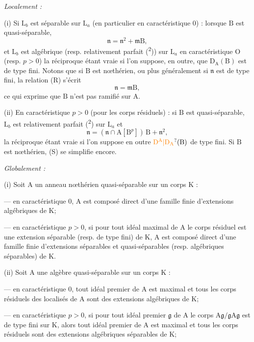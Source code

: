 \textit{Localement :}

(i) Si $\mathrm L_b$ est séparable sur $\mathrm L_a$ (en particulier en caractéristique $0$) : lorsque $\mathrm B$ est quasi-séparable,
\[
\mathfrak n=\mathfrak n^2+\mathfrak m\mathrm B,\tag*{(R)}
\]
et $\mathrm L_b$ est algébrique (resp. relativement parfait (\textsuperscript{2})) sur $\mathrm L_a$ en caractéristique $\mathrm O$ (resp. $p>0$) la réciproque étant vraie si l’on suppose, en outre, que $\mathrm D_{\mathrm A}(\mathrm B)$ est de type fini. Notons que si $\mathrm B$ est nœthérien, ou plus généralement si $\mathfrak n$ est de type fini, la relation (R) s’écrit
\[
\mathfrak n=\mathfrak m\mathrm B,
\]
ce qui exprime que $\mathrm B$ n’est pas ramifié sur $\mathrm A$.

(ii) En caractéristique $p>0$ (pour les corps résiduels) : si $\mathrm B$ est quasi-séparable, $\mathrm L_b$ est relativement parfait (\textsuperscript{2}) sur $\mathrm L_a$ et
\[
\mathfrak n=(\mathfrak n\cap\mathrm A[\mathrm B^p])\,\mathrm B+\mathfrak n^2,\tag*{(S)}
\]
la réciproque étant vraie si l’on suppose en outre $\unsure{\mathrm D^{\mathrm A}|\mathrm D_{\mathrm A}}(\mathrm B)$ de type fini. Si $\mathrm B$ est nœthérien, (S) se simplifie encore.

\textit{Globalement :}

(i) Soit $\mathrm A$ un anneau nœthérien quasi-séparable sur un corps $\mathrm K$ :

--- en caractéristique $0$, $\mathrm A$ est composé direct d’une famille finie d’extensions algébriques de $\mathrm K$;

--- en caractéristique $p>0$, si pour tout idéal maximal de $\mathrm A$ le corps résiduel est une extension séparable (resp. de type fini) de $\mathrm K$, $\mathrm A$ est composé direct d’une famille finie d’extensions séparables et quasi-séparables (resp. algébriques séparables) de $\mathrm K$.

(ii) Soit $\mathrm A$ une algèbre quasi-séparable sur un corps $\mathrm K$ :

--- en caractéristique $0$, tout idéal premier de $\mathrm A$ est maximal et tous les corps résiduels des localisés de $\mathrm A$ sont des extensions algébriques de $\mathrm K$;

--- en caractéristique $p>0$, si pour tout idéal premier $\mathfrak g$ de $\mathrm A$ le corps $\mathrm A\mathfrak g/\mathfrak g\mathrm A\mathfrak g$ est de type fini sur $\mathrm K$, alors tout idéal premier de $\mathrm A$ est maximal et tous les corps résiduels sont des extensions algébriques séparables de $\mathrm K$;

